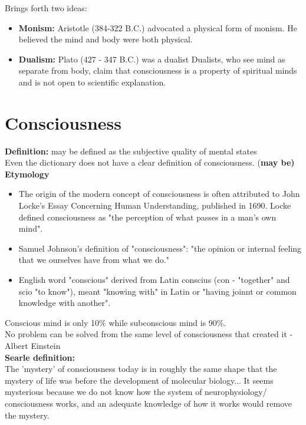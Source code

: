 \documentclass{article}
\begin{document}
\noindent Brings forth two ideas: 
\begin{itemize}
    \item \textbf{Monism:}            
    \subitem Aristotle (384-322 B.C.) advocated a physical form of monism. He believed the mind and body were both physical. 
    \item \textbf{Dualism:}
        \subitem Plato (427 - 347 B.C.) was a dualist
        \subitem Dualists, who see mind as separate from body, claim that consciousness is a property of spiritual minds and is not open to scientific explanation. 
\end{itemize}

\section{Consciousness}
\textbf{Definition:} may be defined as the subjective quality of mental states \\

Even the dictionary does not have a clear definition of consciousness. (\textbf{may be)} \\ 

\noindent \textbf{Etymology}
\begin{itemize}
    \item The origin of the modern concept of consciousness is often attributed to John Locke's Essay Concerning Human Understanding, published in 1690. Locke defined consciousness as "the perception of what passes in a man's own mind". 
    \item Samuel Johnson's definition of "consciousness": "the opinion or internal feeling that we ourselves have from what we do."
    \item English word "conscious" derived from Latin conscius (con - "together" and scio "to know"), meant "knowing with" in Latin or "having joinnt or common knowledge with another". 
\end{itemize}

\noindent Conscious mind is only 10\% while subconscious mind is 90\%. \\
No problem can be solved from the same level of consciousness that created it - Albert Einstein \\ 

\nondent \textbf{Searle definition:} \\
The 'mystery' of consciousness today is in roughly the same shape that the mystery of life was before the development of molecular biology... It seems mysterious because we do not know how the system of neurophysiology/ consciousness works, and an adequate knowledge of how it works would remove the mystery. \\
\end{document}
